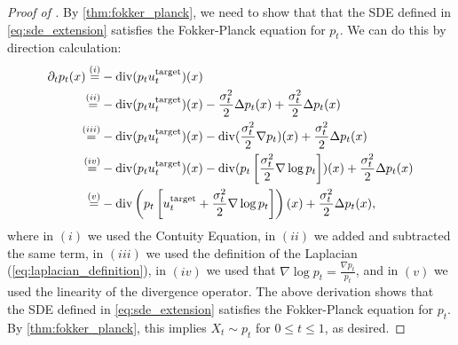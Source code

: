 \begin{proof}[Proof of ]
 By \cref{thm:fokker_planck}, we need to show that that the SDE defined in \cref{eq:sde_extension} satisfies the Fokker-Planck equation for $p_t$. We can do this by direction calculation:
\begin{align*}
    \partial_t p_t(x) \overset{(i)}{=}& - \mathrm{div}(p_tu^{\text{target}}_t)(x)\\
    \overset{(ii)}{=}& - \mathrm{div}(p_tu^{\text{target}}_t)(x) -\frac{\sigma_t^2}{2}\Delta p_t(x)+\frac{\sigma_t^2}{2}\Delta p_t(x)\\
    \overset{(iii)}{=}& - \mathrm{div}(p_tu^{\text{target}}_t)(x) -\mathrm{div}(\frac{\sigma_t^2}{2}\nabla p_t)(x)+\frac{\sigma_t^2}{2}\Delta p_t(x)\\
    \overset{(iv)}{=}& - \mathrm{div}(p_tu^{\text{target}}_t)(x) -\mathrm{div}(p_t\left[\frac{\sigma_t^2}{2}\nabla \log p_t\right])(x)+\frac{\sigma_t^2}{2}\Delta p_t(x)\\
    \overset{(v)}{=}&- \mathrm{div}\left(p_t\left[u^{\text{target}}_t+\frac{\sigma_t^2}{2}\nabla \log p_t\right]\right)(x)+\frac{\sigma_t^2}{2}\Delta p_t(x),
\end{align*}
where in $(i)$ we used the Contuity Equation, in $(ii)$ we added and subtracted the same term, in $(iii)$ we used the definition of the Laplacian (\cref{eq:laplacian_definition}), in $(iv)$ we used that $\nabla\log p_t=\frac{\nabla p_t}{p_t}$, and in $(v)$ we used the linearity of the divergence operator. The above derivation shows that the SDE defined in \cref{eq:sde_extension} satisfies the Fokker-Planck equation for $p_t$. By \cref{thm:fokker_planck}, this implies $X_t\sim p_t$ for $0\leq t\leq 1$, as desired.
\end{proof}

